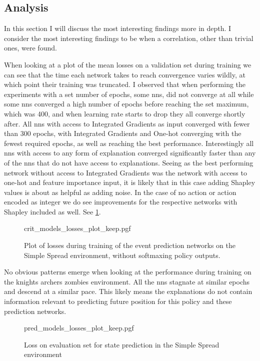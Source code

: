 \documentclass[UKenglish]{uiomasterthesis}
\begin{document}
\subsection{Analysis}
In this section I will discuss the most interesting findings more in depth. I consider the most interesting findings to be when a correlation, other than trivial ones, were found.


When looking at a plot of the mean losses on a validation set during training we can see that the time each network takes to reach convergence varies wildly, at which point their training was truncated. I observed that when performing the experiments with a set number of epochs, some \acp{nn}, did not converge at all while some \acp{nn} converged a high number of epochs before reaching the set maximum, which was 400, and when learning rate starts to drop they all converge shortly after. All \acp{nn} with access to Integrated Gradients as input converged with fewer than 300 epochs, with Integrated Gradients and One-hot converging with the fewest required epochs, as well as reaching the best performance. Interestingly all \acp{nn} with access to any form of explanation converged significantly faster than any of the \acp{nn} that do not have access to explanations. Seeing as the best performing network without access to Integrated Gradients was the network with access to one-hot and feature importance input, it is likely that in this case adding Shapley values is about as helpful as adding noise. In the case of no action or action encoded as integer we do see improvements for the respective networks with Shapley included as well. See \cref{fig:crit_losses}.

\begin{figure}[H]
    \centering
    {crit_models_losses_plot_keep.pgf}
    \caption{Plot of losses during training of the event prediction networks on the Simple Spread environment, without softmaxing policy outputs.}
	\label{fig:crit_losses}
\end{figure}

No obvious patterns emerge when looking at the performance during training on the knights archers zombies environment. All the \acp{nn} stagnate at similar epochs and descend at a similar pace. This likely means the explanations do not contain information relevant to predicting future position for this policy and these prediction networks.

\begin{figure}[H]
    \centering
    {pred_models_losses_plot_keep.pgf}
    \caption{Loss on evaluation set for state prediction in the Simple Spread environment}
	\label{fig:pred_losses}
\end{figure}
\end{document}
